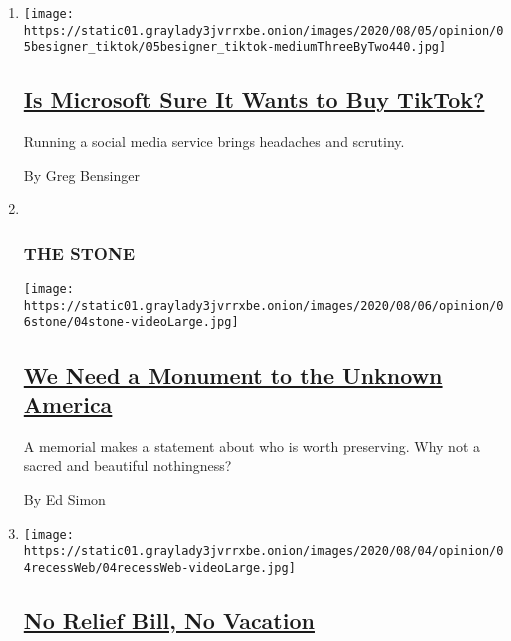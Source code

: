 \begin{enumerate}
\def\labelenumi{\arabic{enumi}.}
\item
  \texttt{[image: https://static01.graylady3jvrrxbe.onion/images/2020/08/05/opinion/05besigner\_tiktok/05besigner\_tiktok-mediumThreeByTwo440.jpg]}

  \hypertarget{is-microsoft-sure-it-wants-to-buy-tiktok}{%
  \subsection{\texorpdfstring{\href{/2020/08/04/opinion/tiktok-microsoft-trump.html}{Is
  Microsoft Sure It Wants to Buy
  TikTok?}}{Is Microsoft Sure It Wants to Buy TikTok?}}\label{is-microsoft-sure-it-wants-to-buy-tiktok}}

  Running a social media service brings headaches and scrutiny.

  By Greg Bensinger
\item ~
  \hypertarget{the-stone}{%
  \subsubsection{THE STONE}\label{the-stone}}

  \texttt{[image: https://static01.graylady3jvrrxbe.onion/images/2020/08/06/opinion/06stone/04stone-videoLarge.jpg]}

  \hypertarget{we-need-a-monument-to-the-unknown-america}{%
  \subsection{\texorpdfstring{\href{/2020/08/04/opinion/us-monuments-rome-unknown-god.html}{We
  Need a Monument to the Unknown
  America}}{We Need a Monument to the Unknown America}}\label{we-need-a-monument-to-the-unknown-america}}

  A memorial makes a statement about who is worth preserving. Why not a
  sacred and beautiful nothingness?

  By Ed Simon
\item
  \texttt{[image: https://static01.graylady3jvrrxbe.onion/images/2020/08/04/opinion/04recessWeb/04recessWeb-videoLarge.jpg]}

  \hypertarget{no-relief-bill-no-vacation}{%
  \subsection{\texorpdfstring{\href{/2020/08/04/opinion/coronavirus-relief-bill-senate-recess.html}{No
  Relief Bill, No
  Vacation}}{No Relief Bill, No Vacation}}\label{no-relief-bill-no-vacation}}


\end{enumerate}
